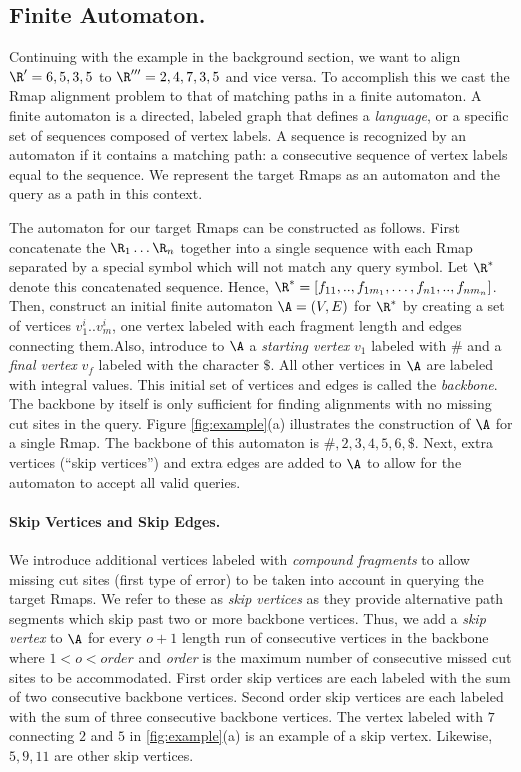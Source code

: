 \documentclass[doctor]{thesis}
\begin{document}
\subsection{Finite Automaton.}

Continuing with the example in the background section, we want to align $\R' = 6,5,3,5$ to $\R''' = 2,4,7,3,5$ and vice versa.  To accomplish this we cast the Rmap alignment problem to that of matching paths in a finite automaton.  A finite automaton is  a directed, labeled graph that defines a \emph{language}, or a specific set of sequences composed of vertex labels.  A sequence is recognized by an automaton if it contains a matching path: a consecutive sequence of vertex labels equal to the sequence. We represent the target Rmaps as an automaton and the query as a path in this context.  

The automaton for our target Rmaps can be constructed as follows.  First concatenate the $\R_1 \ldots \R_n$ together into a single sequence with each Rmap separated by  a special symbol which will not match any query symbol. Let $\R^*$ denote this concatenated sequence. Hence, $\R^* = [f_{11},..,f_{1m_1}, \ldots, f_{n1},..,f_{nm_n}]$.  Then, construct an initial finite automaton $\A = (V, E)$ for $\R^*$ by creating a set of vertices $v^i_1 .. v^i_m$, one vertex labeled with each fragment length and edges connecting them.Also, introduce to $\A$  a {\em starting vertex} $v_1$ labeled with $\#$ and a {\em final vertex} $v_f$ labeled with the character $\$$.  All other vertices in $\A$ are labeled with integral values.  This initial set of vertices and edges is called the {\em backbone}.  The backbone by itself is only sufficient for finding alignments with no missing cut sites in the query. Figure \ref{fig:example}(a) illustrates the construction of $\A$ for a single Rmap.  The backbone of this automaton is $\#, 2, 3, 4, 5, 6, \$$.  Next, extra vertices (``skip vertices'') and extra edges are added to $\A$ to allow for the automaton to accept all valid queries.  

\paragraph{Skip Vertices and Skip Edges.}
We introduce additional vertices labeled with {\em compound fragments} to allow missing cut sites (first type of error) to be taken into account in querying the target Rmaps.  We refer to these as {\em skip vertices} as they provide alternative path segments which skip past two or more backbone vertices. Thus, we add a {\em skip vertex} to $\A$ for every $o+1$ length run of consecutive vertices in the backbone where $1 < o < order$ and  \emph{order} is the maximum number of consecutive missed cut sites to be accommodated.  First order skip vertices are each labeled with the sum of two consecutive backbone vertices.  Second order skip vertices are each labeled with the sum of three consecutive backbone vertices. The vertex labeled with $7$ connecting $2$ and $5$ in \ref{fig:example}(a) is an example of a skip vertex.  Likewise, $5, 9, 11$ are other skip vertices.
\end{document}
